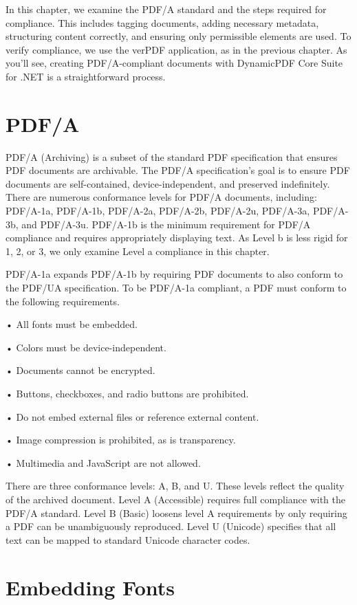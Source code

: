 \documentclass[american,letterpaper]{tufte-book}
\numberwithin{equation}{section}
\numberwithin{figure}{section}
\begin{document}
{{In this chapter, we examine the PDF/A standard and the steps required for compliance. This includes tagging documents, adding necessary metadata, structuring content correctly, and ensuring only permissible elements are used. To verify compliance, we use the verPDF application, as in the previous chapter. As you'll see, creating PDF/A-compliant documents with DynamicPDF Core Suite for .NET is a straightforward process.
\section{PDF/A}

PDF/A (Archiving) is a subset of the standard PDF specification that
ensures PDF documents are archivable. The PDF/A specification's goal
is to ensure PDF documents are self-contained, device-independent,
and preserved indefinitely. There are numerous conformance levels
for PDF/A documents, including: PDF/A-1a, PDF/A-1b, PDF/A-2a, PDF/A-2b,
PDF/A-2u, PDF/A-3a, PDF/A-3b, and PDF/A-3u. PDF/A-1b is the minimum
requirement for PDF/A compliance and requires appropriately displaying
text. As Level b is less rigid for 1, 2, or 3, we only examine Level
a compliance in this chapter.

PDF/A-1a expands PDF/A-1b by requiring PDF documents to also conform
to the PDF/UA specification. To be PDF/A-1a compliant, a PDF must
conform to the following requirements. 

• All fonts must be embedded.

• Colors must be device-independent.

• Documents cannot be encrypted.

• Buttons, checkboxes, and radio buttons are prohibited.

• Do not embed external files or reference external content.

• Image compression is prohibited, as is transparency.

• Multimedia and JavaScript are not allowed.

There are three conformance levels: A, B, and U. These levels reflect
the quality of the archived document. Level A (Accessible) requires
full compliance with the PDF/A standard. Level B (Basic) loosens level
A requirements by only requiring a PDF can be unambiguously reproduced.
Level U (Unicode) specifies that all text can be mapped to standard
Unicode character codes.

\section{Embedding Fonts}

}}
\end{document}
